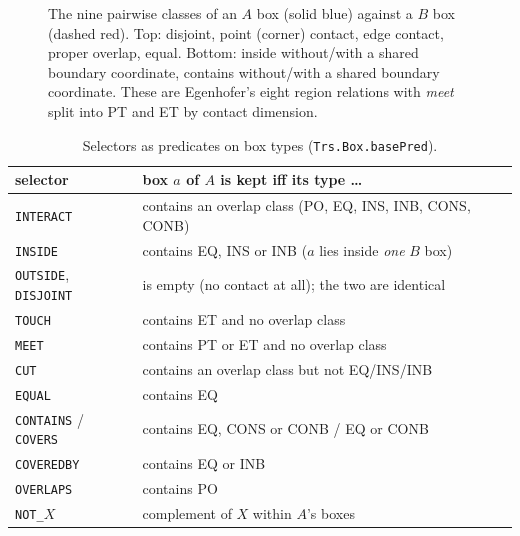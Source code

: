\documentclass[11pt]{article}
\newcommand{\op}[1]{\texttt{#1}}
\begin{document}
\begin{figure}[t]
\centering
\newcommand{\cls}[4]{\begin{scope}[shift={(#1,#2)}]#3
  \node[font=\small\bfseries,anchor=north] at (1.1,-0.2){#4};\end{scope}}
\caption{The nine pairwise classes of an $A$ box (solid blue) against a $B$ box (dashed red). Top: disjoint, point (corner) contact, edge contact, proper overlap, equal. Bottom: inside without/with a shared boundary coordinate, contains without/with a shared boundary coordinate. These are Egenhofer's eight region relations with \emph{meet} split into PT and ET by contact dimension.}
\label{fig:classes}
\end{figure}

\begin{table}[t]
\centering\small
\begin{tabular}{ll}
\toprule
selector & box $a$ of $A$ is kept iff its type \dots\\
\midrule
\op{INTERACT} & contains an overlap class (PO, EQ, INS, INB, CONS, CONB)\\
\op{INSIDE} & contains EQ, INS or INB ($a$ lies inside \emph{one} $B$ box)\\
\op{OUTSIDE}, \op{DISJOINT} & is empty (no contact at all); the two are identical\\
\op{TOUCH} & contains ET and no overlap class\\
\op{MEET} & contains PT or ET and no overlap class\\
\op{CUT} & contains an overlap class but not EQ/INS/INB\\
\op{EQUAL} & contains EQ\\
\op{CONTAINS} / \op{COVERS} & contains EQ, CONS or CONB / EQ or CONB\\
\op{COVEREDBY} & contains EQ or INB\\
\op{OVERLAPS} & contains PO\\
\op{NOT\_}$X$ & complement of $X$ within $A$'s boxes\\
\bottomrule
\end{tabular}
\caption{Selectors as predicates on box types (\texttt{Trs.Box.basePred}).}
\label{tab:sel}
\end{table}
\end{document}
